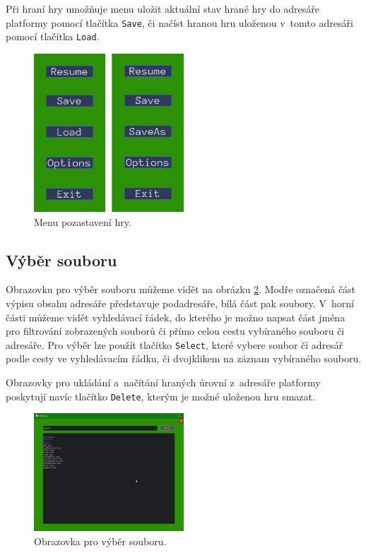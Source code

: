 Při hraní hry umožňuje menu uložit aktuální stav hrané hry do adresáře platformy pomocí tlačítka \texttt{Save}, či načíst hranou hru uloženou v~tomto adresáři pomocí tlačítka \texttt{Load}.

\begin{figure}[h]
	\centering
	\includegraphics[width=0.5\textwidth]{img/PauseMenuComparison.png}
	\caption{Menu pozastavení hry.}
	\label{fig:pauseMenu}
\end{figure}


\subsection{Výběr souboru}
Obrazovku pro výběr souboru můžeme vidět na obrázku \ref{fig:filepicking}. Modře označená část výpisu obsahu adresáře představuje podadresáře, bílá část pak soubory. V~horní části můžeme vidět vyhledávací řádek, do kterého je možno napsat část jména pro filtrování zobrazených souborů či přímo celou cestu vybíraného souboru či adresáře. Pro výběr lze použít tlačítko \texttt{Select}, které vybere soubor či adresář podle cesty ve vyhledávacím řádku, či dvojklikem na záznam vybíraného souboru.

Obrazovky pro ukládání a~načítání hraných úrovní z~adresáře platformy poskytují navíc tlačítko \texttt{Delete}, kterým je možné uloženou hru smazat.

\begin{figure}[h]
	\centering
	\includegraphics[width=0.5\textwidth]{img/FilePickingScreen.png}
	\caption{Obrazovka pro výběr souboru.}
	\label{fig:filepicking}
\end{figure}

